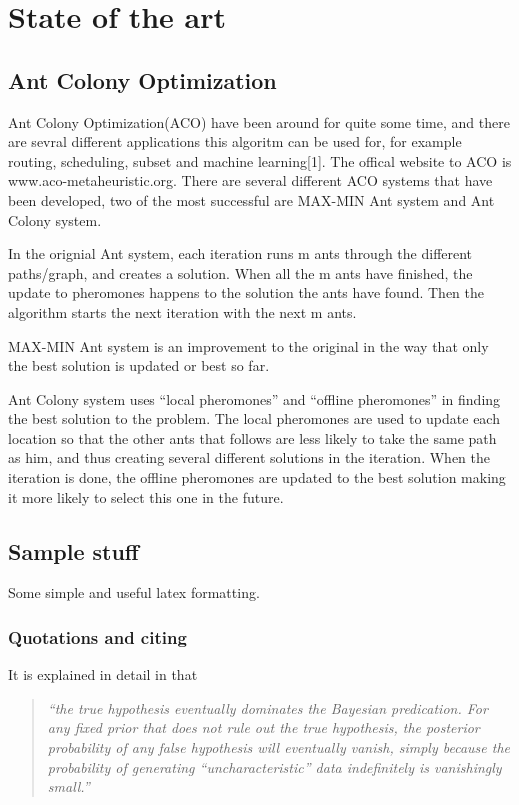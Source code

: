 \chapter{State of the art}
\label{ch:background}

\section{Ant Colony Optimization}

Ant Colony Optimization(ACO) have been around for quite some time, and there are sevral different applications this algoritm can be used for, for example routing, scheduling, subset and machine learning[1]. The offical website to ACO is www.aco-metaheuristic.org. There are several different ACO systems that have been developed, two of the most successful are MAX-MIN Ant system and Ant Colony system.

In the orignial Ant system, each iteration runs m ants through the different paths/graph, and creates a solution. When all the m ants have finished, the update to pheromones happens to the solution the ants have found. Then the algorithm starts the next iteration with the next m ants.

MAX-MIN Ant system is an improvement to the original in the way that only the best solution is updated or best so far.

Ant Colony system uses “local pheromones” and “offline pheromones” in finding the best solution to the problem. The local pheromones are used to update each location so that the other ants that follows are less likely to take the same path as him, and thus creating several different solutions in the iteration. When the iteration is done, the offline pheromones are updated to the best solution making it more likely to select this one in the future.


\section{Sample stuff}
Some simple and useful latex formatting.

\subsection{Quotations and citing}
It is explained in detail in \cite[Ch.20]{Norvig03} that 
\begin{quotation}
\noindent \textit{``the true hypothesis eventually dominates the Bayesian predication. For any fixed prior that does not rule out the true hypothesis, the posterior probability of any false hypothesis will eventually vanish, simply because the probability of generating ``uncharacteristic'' data indefinitely is vanishingly small.''}
\end{quotation}
